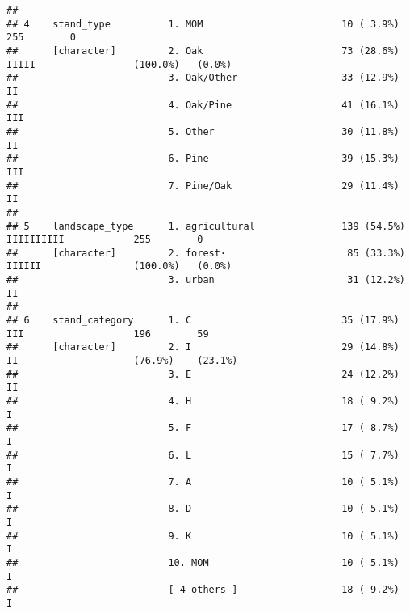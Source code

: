 \documentclass[
]{article}
\begin{document}
\begin{verbatim}
## 
## 4    stand_type          1. MOM                        10 ( 3.9%)                                  255        0         
##      [character]         2. Oak                        73 (28.6%)            IIIII                 (100.0%)   (0.0%)    
##                          3. Oak/Other                  33 (12.9%)            II                                         
##                          4. Oak/Pine                   41 (16.1%)            III                                        
##                          5. Other                      30 (11.8%)            II                                         
##                          6. Pine                       39 (15.3%)            III                                        
##                          7. Pine/Oak                   29 (11.4%)            II                                         
## 
## 5    landscape_type      1. agricultural               139 (54.5%)           IIIIIIIIII            255        0         
##      [character]         2. forest·                     85 (33.3%)           IIIIII                (100.0%)   (0.0%)    
##                          3. urban                       31 (12.2%)           II                                         
## 
## 6    stand_category      1. C                          35 (17.9%)            III                   196        59        
##      [character]         2. I                          29 (14.8%)            II                    (76.9%)    (23.1%)   
##                          3. E                          24 (12.2%)            II                                         
##                          4. H                          18 ( 9.2%)            I                                          
##                          5. F                          17 ( 8.7%)            I                                          
##                          6. L                          15 ( 7.7%)            I                                          
##                          7. A                          10 ( 5.1%)            I                                          
##                          8. D                          10 ( 5.1%)            I                                          
##                          9. K                          10 ( 5.1%)            I                                          
##                          10. MOM                       10 ( 5.1%)            I                                          
##                          [ 4 others ]                  18 ( 9.2%)            I                                          

\end{verbatim}
\end{document}
